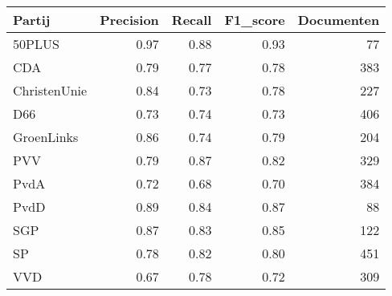 \begin{tabular}{lrrrr}
\toprule
       Partij &  Precision &  Recall &  F1\_score &  Documenten \\
\midrule
       50PLUS &       0.97 &    0.88 &      0.93 &          77 \\
          CDA &       0.79 &    0.77 &      0.78 &         383 \\
 ChristenUnie &       0.84 &    0.73 &      0.78 &         227 \\
          D66 &       0.73 &    0.74 &      0.73 &         406 \\
   GroenLinks &       0.86 &    0.74 &      0.79 &         204 \\
          PVV &       0.79 &    0.87 &      0.82 &         329 \\
         PvdA &       0.72 &    0.68 &      0.70 &         384 \\
         PvdD &       0.89 &    0.84 &      0.87 &          88 \\
          SGP &       0.87 &    0.83 &      0.85 &         122 \\
           SP &       0.78 &    0.82 &      0.80 &         451 \\
          VVD &       0.67 &    0.78 &      0.72 &         309 \\
\bottomrule
\end{tabular}
